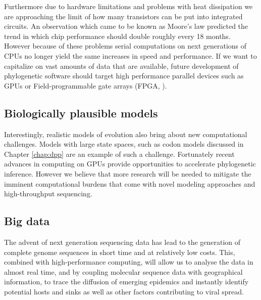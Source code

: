 Furthermore due to hardware limitations and problems with heat dissipation we are approaching the limit of how many transistors can be put into integrated circuits.
An observation which came to be known as Moore's law predicted the trend in which chip performance should double roughly every 18 months.
However because of these problems serial computations on next generations of CPUs no longer yield the same increases in speed and performance.
If we want to capitalize on vast amounts of data that are available, future development of phylogenetic software should target high performance parallel devices such as GPUs \citep{Nickolls2008} or Field-programmable gate arrays (FPGA, \citet{Kuon2008}).

\subsection{Biologically plausible models}

Interestingly, realistic models of evolution also bring about new computational challenges.
Models with large state spaces, such as codon models discussed in Chapter \ref{chap:dpp} are an example of such a challenge.
Fortunately recent advances in computing on GPUs \citep{Ayres2012} provide opportunities to accelerate phylogenetic inference.
However we believe that more research will be needed to mitigate the imminent computational burdens that come with novel modeling approaches and high-throughput sequencing. 

\subsection{Big data}
The advent of next generation sequencing data has lead to the generation of complete genome sequences in short time and at relatively low costs.
This, combined with high-performance computing, will allow us to analyse the data in almost real time, and by coupling molecular sequence data with geographical information, to trace the diffusion of emerging epidemics and instantly identify potential hosts and sinks as well as other factors contributing to viral spread.   


